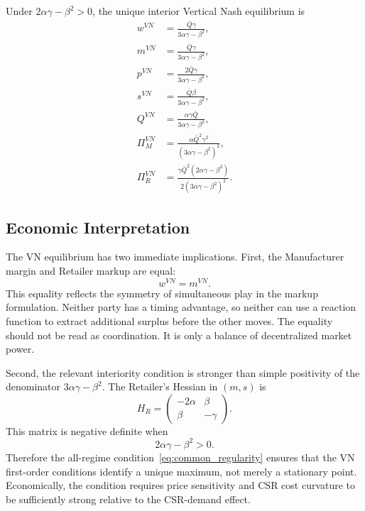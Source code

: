 \begin{proposition}
\label{prop:vn}
Under $2\alpha\gamma-\beta^2>0$, the unique interior Vertical Nash equilibrium is
\begin{align*}
    w^{VN} &= \frac{\bar{Q}\gamma}{3\alpha\gamma-\beta^2},\\
    m^{VN} &= \frac{\bar{Q}\gamma}{3\alpha\gamma-\beta^2},\\
    p^{VN} &= \frac{2\bar{Q}\gamma}{3\alpha\gamma-\beta^2},\\
    s^{VN} &= \frac{\bar{Q}\beta}{3\alpha\gamma-\beta^2},\\
    Q^{VN} &= \frac{\alpha\gamma\bar{Q}}{3\alpha\gamma-\beta^2},\\
    \Pi_M^{VN} &= \frac{\alpha\bar{Q}^2\gamma^2}{(3\alpha\gamma-\beta^2)^2},\\
    \Pi_R^{VN} &= \frac{\gamma\bar{Q}^2(2\alpha\gamma-\beta^2)}{2(3\alpha\gamma-\beta^2)^2}.
\end{align*}
\end{proposition}

\subsection{Economic Interpretation}

The VN equilibrium has two immediate implications. First, the Manufacturer margin and Retailer markup are equal:
\begin{equation*}
    w^{VN}=m^{VN}.
\end{equation*}
This equality reflects the symmetry of simultaneous play in the markup formulation. Neither party has a timing advantage, so neither can use a reaction function to extract additional surplus before the other moves. The equality should not be read as coordination. It is only a balance of decentralized market power.

Second, the relevant interiority condition is stronger than simple positivity of the denominator $3\alpha\gamma-\beta^2$. The Retailer's Hessian in $(m,s)$ is
\begin{equation*}
    H_R=\begin{pmatrix}
        -2\alpha & \beta\\
        \beta & -\gamma
    \end{pmatrix}.
\end{equation*}
This matrix is negative definite when
\begin{equation*}
    2\alpha\gamma-\beta^2>0.
\end{equation*}
Therefore the all-regime condition~\eqref{eq:common_regularity} ensures that the VN first-order conditions identify a unique maximum, not merely a stationary point. Economically, the condition requires price sensitivity and CSR cost curvature to be sufficiently strong relative to the CSR-demand effect.

